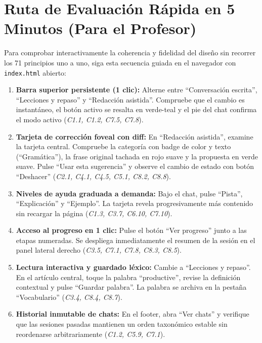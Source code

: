 \documentclass[10pt,a4paper]{article}
\begin{document}
\vspace{0.8em}

\section{Ruta de Evaluación Rápida en 5 Minutos (Para el Profesor)}

Para comprobar interactivamente la coherencia y fidelidad del diseño sin recorrer los 71 principios uno a uno, siga esta secuencia guiada en el navegador con \texttt{index.html} abierto:

\begin{enumerate}[leftmargin=1.8em, itemsep=0.4em]
    \item \textbf{Barra superior persistente (1 clic):} Alterne entre ``Conversación escrita'', ``Lecciones y repaso'' y ``Redacción asistida''. Compruebe que el cambio es instantáneo, el botón activo se resalta en verde-teal y el pie del chat confirma el modo activo (\textit{C1.1, C1.2, C7.5, C7.8}).
    \item \textbf{Tarjeta de corrección foveal con diff:} En ``Redacción asistida'', examine la tarjeta central. Compruebe la categoría con badge de color y texto (``Gramática''), la frase original tachada en rojo suave y la propuesta en verde suave. Pulse ``Usar esta sugerencia'' y observe el cambio de estado con botón ``Deshacer'' (\textit{C2.1, C4.1, C4.5, C5.1, C8.2, C8.8}).
    \item \textbf{Niveles de ayuda graduada a demanda:} Bajo el chat, pulse ``Pista'', ``Explicación'' y ``Ejemplo''. La tarjeta revela progresivamente más contenido sin recargar la página (\textit{C1.3, C3.7, C6.10, C7.10}).
    \item \textbf{Acceso al progreso en 1 clic:} Pulse el botón ``Ver progreso'' junto a las etapas numeradas. Se despliega inmediatamente el resumen de la sesión en el panel lateral derecho (\textit{C3.5, C7.1, C7.8, C8.3, C8.5}).
    \item \textbf{Lectura interactiva y guardado léxico:} Cambie a ``Lecciones y repaso''. En el artículo central, toque la palabra ``productive'', revise la definición contextual y pulse ``Guardar palabra''. La palabra se archiva en la pestaña ``Vocabulario'' (\textit{C3.4, C8.4, C8.7}).
    \item \textbf{Historial inmutable de chats:} En el footer, abra ``Ver chats'' y verifique que las sesiones pasadas mantienen un orden taxonómico estable sin reordenarse arbitrariamente (\textit{C1.2, C5.9, C7.1}).
\end{enumerate}
\end{document}
